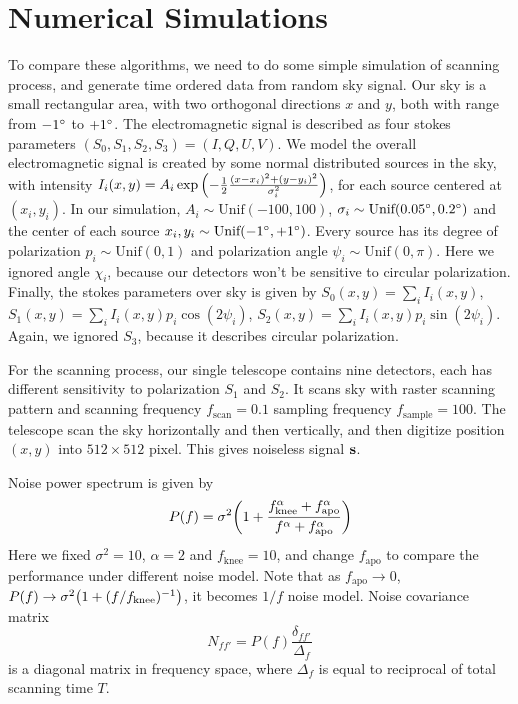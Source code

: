 \documentclass[11pt, letterpaper]{article}
\begin{document}
\section{Numerical Simulations}
To compare these algorithms, we need to do some simple simulation of scanning
process, and generate time ordered data from random sky signal.
Our sky is a small rectangular area, with two orthogonal directions $x$ and
$y$, both with range from $-1\degree$ to $+1\degree$.
The electromagnetic signal is described as four stokes parameters
$(S_0, S_1, S_2, S_3) = (I,Q,U,V)$.
We model the overall electromagnetic signal is created by some normal
distributed sources in the sky, with intensity $I_i (x,y)
= A_i \exp\qty(-\frac{1}{2} \frac{(x-x_{i})^2 + (y-y_{i})^2}{\sigma_i^2})$,
for each source centered at $(x_i,y_i)$.
In our simulation, $A_i \sim \text{Unif} (-100, 100)$,
$\sigma_i \sim \text{Unif}(0.05\degree, 0.2\degree)$ 
and the center of each source
$x_i, y_i \sim \text{Unif}(-1\degree, +1\degree)$.
Every source has its degree of polarization $p_i \sim \text{Unif}(0,1)$ and 
polarization angle $\psi_i \sim \text{Unif}(0,\pi)$.
Here we ignored angle $\chi_i$, because our detectors won't be sensitive to
circular polarization.
Finally, the stokes parameters over sky is given by
$S_0(x,y) = \sum_i I_i(x,y)$, $S_1(x,y) = \sum_i I_i(x,y) p_i \cos(2\psi_i)$,
$S_2(x,y) = \sum_i I_i(x,y) p_i \sin(2\psi_i)$.
Again, we ignored $S_3$, because it describes circular polarization.

For the scanning process, our single telescope contains nine detectors,
each has different sensitivity to polarization $S_1$ and $S_2$.
It scans sky with raster scanning pattern and scanning frequency
$f_{\text{scan}} = 0.1$ sampling frequency $f_{\text{sample}} = 100$.
The telescope scan the sky horizontally and then vertically,
and then digitize position $(x, y)$ into $512\times 512$ pixel.
This gives noiseless signal $\vb{s}$.

Noise power spectrum is given by
\begin{align}
P(f) = \sigma^2 \qty(1+ \frac{f_{\text{knee}}^{\alpha}+f_{\text{apo}}^{\alpha}}
    {f^{\alpha}+f_{\text{apo}}^{\alpha}}) \label{noise power spectrum}
\end{align}
Here we fixed $\sigma^2 = 10$, $\alpha = 2$ and $f_{\text{knee}} = 10$,
and change $f_{\text{apo}}$ to compare the performance under different noise
model.
Note that as $f_{\text{apo}} \rightarrow 0 $,
$P(f) \rightarrow \sigma^2\qty(1 + (f/f_{\text{knee}})^{-1} )$, 
it becomes $1/f$ noise model.
Noise covariance matrix 
\begin{equation}
N_{ff'} = P(f) \frac{\delta_{ff'}}{\Delta_f}
\end{equation}
is a diagonal matrix in frequency space, where $\Delta_f$ is equal to reciprocal
of total scanning time $T$.
\end{document}
